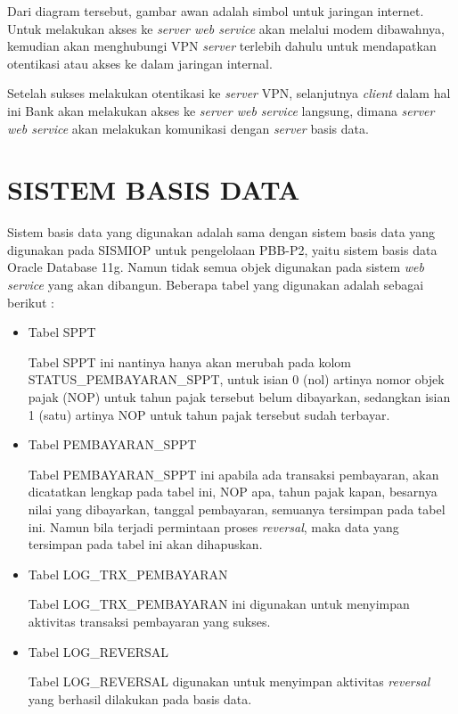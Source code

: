 \documentclass[pdftex,12pt, oneside]{article}
\begin{document}
Dari diagram tersebut, gambar awan adalah simbol untuk jaringan internet. Untuk melakukan akses ke \textit{server web service} akan melalui modem dibawahnya, kemudian akan menghubungi VPN \textit{server} terlebih dahulu untuk mendapatkan otentikasi atau akses ke dalam jaringan internal.

Setelah sukses melakukan otentikasi ke \textit{server} VPN, selanjutnya \textit{client} dalam hal ini Bank akan melakukan akses ke \textit{server web service} langsung, dimana \textit{server web service} akan melakukan komunikasi dengan \textit{server} basis data.

\section{SISTEM BASIS DATA}

Sistem basis data yang digunakan adalah sama dengan sistem basis data yang digunakan pada SISMIOP untuk pengelolaan PBB-P2, yaitu sistem basis data Oracle Database 11g. Namun tidak semua objek digunakan pada sistem \textit{web service} yang akan dibangun. Beberapa tabel yang digunakan adalah sebagai berikut :

\begin{itemize}
  \item Tabel SPPT
  
  Tabel SPPT ini nantinya hanya akan merubah pada kolom STATUS\_PEMBAYARAN\_SPPT, untuk isian 0 (nol) artinya nomor objek pajak (NOP) untuk tahun pajak tersebut belum dibayarkan, sedangkan isian 1 (satu) artinya NOP untuk tahun pajak tersebut sudah terbayar.
  
  \item Tabel PEMBAYARAN\_SPPT
  
  Tabel PEMBAYARAN\_SPPT ini apabila ada transaksi pembayaran, akan dicatatkan lengkap pada tabel ini, NOP apa, tahun pajak kapan, besarnya nilai yang dibayarkan, tanggal pembayaran, semuanya tersimpan pada tabel ini. Namun bila terjadi permintaan proses \textit{reversal}, maka data yang tersimpan pada tabel ini akan dihapuskan.
  
  \item Tabel LOG\_TRX\_PEMBAYARAN
  
  Tabel LOG\_TRX\_PEMBAYARAN ini digunakan untuk menyimpan aktivitas transaksi pembayaran yang sukses.
  
  \item Tabel LOG\_REVERSAL
  
  Tabel LOG\_REVERSAL digunakan untuk menyimpan aktivitas \textit{reversal} yang berhasil dilakukan pada basis data.
\end{itemize}
\end{document}
